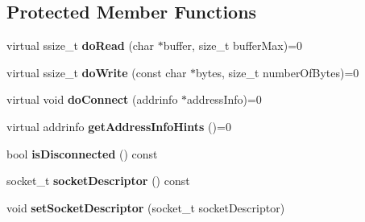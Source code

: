 \subsection*{Protected Member Functions}
\begin{DoxyCompactItemize}
\item 
\mbox{\label{class_cpp_serial_port_1_1_abstract_socket_a81a8ada743d774b537f77bcee7868cc8}} 
virtual ssize\+\_\+t {\bfseries do\+Read} (char $\ast$buffer, size\+\_\+t buffer\+Max)=0
\item 
\mbox{\label{class_cpp_serial_port_1_1_abstract_socket_ad617d4ecc652d53cffea1bf1f47579b3}} 
virtual ssize\+\_\+t {\bfseries do\+Write} (const char $\ast$bytes, size\+\_\+t number\+Of\+Bytes)=0
\item 
\mbox{\label{class_cpp_serial_port_1_1_abstract_socket_afff72ec26ca22c4d9bd6c6488b0ec066}} 
virtual void {\bfseries do\+Connect} (addrinfo $\ast$address\+Info)=0
\item 
\mbox{\label{class_cpp_serial_port_1_1_abstract_socket_a1f57b2412c2ac25a6b3394b7687d9bf6}} 
virtual addrinfo {\bfseries get\+Address\+Info\+Hints} ()=0
\item 
\mbox{\label{class_cpp_serial_port_1_1_abstract_socket_a6a8f71f6ce1556c428f44628c19f8161}} 
bool {\bfseries is\+Disconnected} () const
\item 
\mbox{\label{class_cpp_serial_port_1_1_abstract_socket_ae1198d2be2aa6033abe0a7f90916a3c6}} 
socket\+\_\+t {\bfseries socket\+Descriptor} () const
\item 
\mbox{\label{class_cpp_serial_port_1_1_abstract_socket_a9dc9e64a56d7249d982cb074acb723a7}} 
void {\bfseries set\+Socket\+Descriptor} (socket\+\_\+t socket\+Descriptor)
\end{DoxyCompactItemize}
